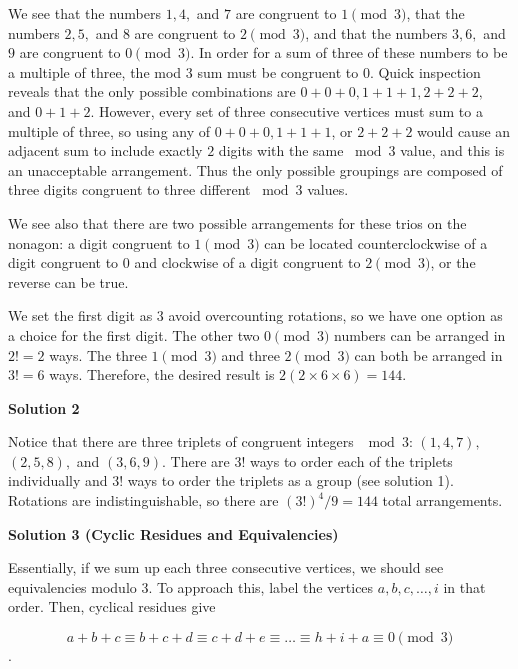 \begin{enumerate}
 We see that the numbers $1, 4,$ and $7$ are congruent to $1 \pmod{3}$, that the numbers $2, 5,$ and $8$ are congruent to $2 \pmod{3}$, and that the numbers $3, 6,$ and $9$ are congruent to $0 \pmod{3}$. In order for a sum of three of these numbers to be a multiple of three, the mod $3$ sum must be congruent to $0$. Quick inspection reveals that the only possible combinations are $0+0+0, 1+1+1, 2+2+2,$ and $0+1+2$. However, every set of three consecutive vertices must sum to a multiple of three, so using any of $0+0+0, 1+1+1$, or $2+2+2$ would cause an adjacent sum to include exactly $2$ digits with the same $\bmod{3}$ value, and this is an unacceptable arrangement. Thus the only possible groupings are composed of three digits congruent to three different $\bmod{3}$ values. 

 We see also that there are two possible arrangements for these trios on the nonagon: a digit congruent to $1 \pmod{3}$ can be located counterclockwise of a digit congruent to $0$ and clockwise of a digit congruent to $2 \pmod{3}$, or the reverse can be true. 

 We set the first digit as $3$ avoid overcounting rotations, so we have one option as a choice for the first digit.  The other two $0 \pmod{3}$ numbers can be arranged in $2!=2$ ways.  The three $1 \pmod{3}$ and three $2 \pmod{3}$ can both be arranged in $3!=6$ ways.  Therefore, the desired result is $2(2 \times 6 \times 6)=\boxed{144}$.

 



\textbf{Solution 2}

Notice that there are three triplets of congruent integers $\mod 3$: $(1,4,7),$ $(2,5,8),$ and $(3,6,9).$ There are $3!$ ways to order each of the triplets individually and $3!$ ways to order the triplets as a group (see solution 1). Rotations are indistinguishable, so there are $(3!)^4/9=\boxed{144}$ total arrangements.

 



\textbf{Solution 3 (Cyclic Residues and Equivalencies)}

Essentially, if we sum up each three consecutive vertices, we should see equivalencies modulo 3. To approach this, label the vertices $a, b, c, \dots, i$ in that order. Then, cyclical residues give

 
 \[a+b+c \equiv b+c+d \equiv c+d+e \equiv \dots \equiv h+i+a \equiv 0 \pmod{3}\].


\end{enumerate}
